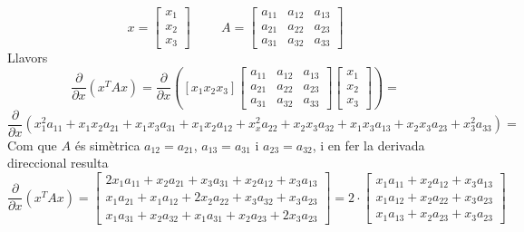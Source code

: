 \documentclass[twoside]{article}
\begin{document}
\begin{equation}
x=\left[ \begin{array}{c}
x_1 \\
x_2 \\
x_3 
\end{array} \right] \hspace{1cm} A=\left[ \begin{array}{ccc}
a_{11} & a_{12} & a_{13} \\
a_{21} & a_{22} & a_{23} \\
a_{31} & a_{32} & a_{33} 
\end{array} \right]
\end{equation}
Llavors
\begin{equation}
\frac{\partial}{\partial x}(x^{T}A x) = \frac{\partial}{\partial x}\left(\left[x_1 x_2 x_3 \right]\left[\begin{array}{ccc}
a_{11} & a_{12} & a_{13} \\
a_{21} & a_{22} & a_{23} \\
a_{31} & a_{32} & a_{33} 
\end{array} \right]\left[\begin{array}{c}
x_1 \\
x_2 \\
x_3 
\end{array} \right] \right) =
\end{equation}
\begin{equation}
\frac{\partial}{\partial x}(x^2_1 a_{11}+x_1x_2a_{21}+x_1x_3a_{31} + x_1x_2a_{12}+x^2_xa_{22}+x_2x_3a_{32} + x_1x_3a_{13}+x_2x_3a_{23}+x^2_3a_{33})=
\end{equation}
Com que $A$ és simètrica $a_{12}=a_{21}$, $a_{13}=a_{31}$ i $a_{23}=a_{32}$, i en fer la derivada direccional resulta
\begin{equation}
\frac{\partial}{\partial x}(x^{T}A x)=\left[ \begin{array}{c}
2x_1a_{11}+x_2a_{21}+x_3a_{31}+x_2a_{12}+x_3a_{13} \\
x_1a_{21}+x_1a_{12}+2x_2a_{22}+x_3a_{32}+x_3a_{23} \\
x_1a_{31}+x_2a_{32}+x_1a_{31}+x_2a_{23}+2x_3a_{23}
\end{array} \right]=2\cdot\left[ \begin{array}{c}
x_1a_{11}+x_2a_{12}+x_3a_{13} \\
x_1a_{12}+x_2a_{22}+x_3a_{23} \\
x_1a_{13}+x_2a_{23}+x_3a_{23}
\end{array} \right]
\end{equation}
\end{document}
